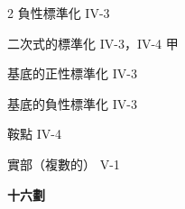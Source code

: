 \begin{multicols}{2}
\noindent\hspace*{1.5em} 負性標準化 \hfill IV-3\par
\noindent\hspace*{1.5em} 二次式的標準化 \hfill IV-3，IV-4 甲\par
\noindent\hspace*{1.5em} 基底的正性標準化 \hfill IV-3\par
\noindent\hspace*{1.5em} 基底的負性標準化 \hfill IV-3\par
\noindent 鞍點 \hfill IV-4\par
\noindent 實部（複數的） \hfill V-1\par

\vspace{0.8em}
\begin{center}
\textbf{\large 十六劃}
\end{center}


\end{multicols}

